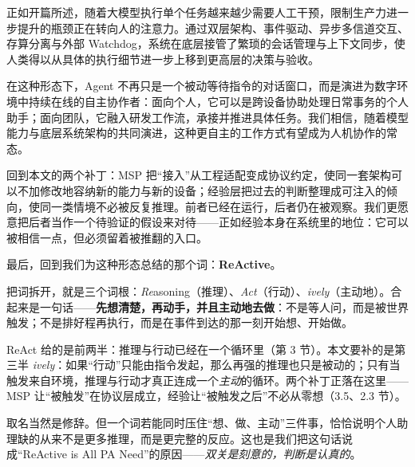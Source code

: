 \documentclass[11pt,a4paper,UTF8,fontset=windows]{ctexart}
\begin{document}
正如开篇所述，随着大模型执行单个任务越来越少需要人工干预，限制生产力进一步提升的瓶颈正在转向人的注意力。通过双层架构、事件驱动、异步多信道交互、存算分离与外部 Watchdog，系统在底层接管了繁琐的会话管理与上下文同步，使人类得以从具体的执行细节进一步上移到更高层的决策与验收。

在这种形态下，Agent 不再只是一个被动等待指令的对话窗口，而是演进为数字环境中持续在线的自主协作者：面向个人，它可以是跨设备协助处理日常事务的个人助手；面向团队，它融入研发工作流，承接并推进具体任务。我们相信，随着模型能力与底层系统架构的共同演进，这种更自主的工作方式有望成为人机协作的常态。

回到本文的两个补丁：MSP 把“接入”从工程适配变成协议约定，使同一套架构可以不加修改地容纳新的能力与新的设备；经验层把过去的判断整理成可注入的倾向，使同一类情境不必被反复推理。前者已经在运行，后者仍在被观察。我们更愿意把后者当作一个待验证的假设来对待——正如经验本身在系统里的地位：它可以被相信一点，但必须留着被推翻的入口。

最后，回到我们为这种形态总结的那个词：\textbf{ReActive}。

把词拆开，就是三个词根：\emph{Re}asoning（推理）、\emph{Act}（行动）、\emph{ively}（主动地）。合起来是一句话——\textbf{先想清楚，再动手，并且主动地去做}：不是等人问，而是被世界触发；不是排好程再执行，而是在事件到达的那一刻开始想、开始做。

ReAct 给的是前两半：推理与行动已经在一个循环里（第 3 节）。本文要补的是第三半 \emph{ively}：如果“行动”只能由指令发起，那么再强的推理也只是被动的；只有当触发来自环境，推理与行动才真正连成一个\emph{主动}的循环。两个补丁正落在这里——MSP 让“被触发”在协议层成立，经验让“被触发之后”不必从零想（3.5、2.3 节）。

取名当然是修辞。但一个词若能同时压住“想、做、主动”三件事，恰恰说明个人助理缺的从来不是更多推理，而是更完整的反应。这也是我们把这句话说成“ReActive is All PA Need”的原因——\emph{双关是刻意的，判断是认真的}。
\end{document}
